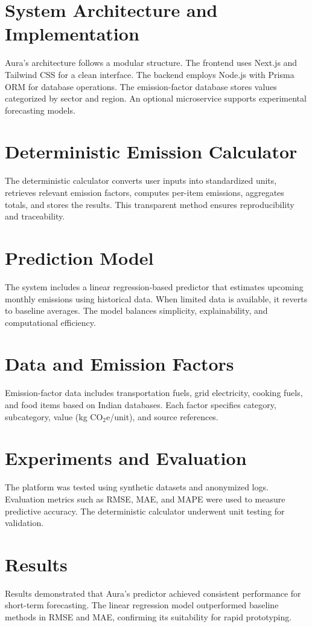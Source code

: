 \documentclass[journal]{IEEEtran}
\begin{document}
\section{System Architecture and Implementation}
Aura's architecture follows a modular structure. The frontend uses Next.js and Tailwind CSS for a clean interface. The backend employs Node.js with Prisma ORM for database operations. The emission-factor database stores values categorized by sector and region. An optional microservice supports experimental forecasting models.

\section{Deterministic Emission Calculator}
The deterministic calculator converts user inputs into standardized units, retrieves relevant emission factors, computes per-item emissions, aggregates totals, and stores the results. This transparent method ensures reproducibility and traceability.

\section{Prediction Model}
The system includes a linear regression-based predictor that estimates upcoming monthly emissions using historical data. When limited data is available, it reverts to baseline averages. The model balances simplicity, explainability, and computational efficiency.

\section{Data and Emission Factors}
Emission-factor data includes transportation fuels, grid electricity, cooking fuels, and food items based on Indian databases. Each factor specifies category, subcategory, value (kg CO$_2$e/unit), and source references.

\section{Experiments and Evaluation}
The platform was tested using synthetic datasets and anonymized logs. Evaluation metrics such as RMSE, MAE, and MAPE were used to measure predictive accuracy. The deterministic calculator underwent unit testing for validation.

\section{Results}
Results demonstrated that Aura's predictor achieved consistent performance for short-term forecasting. The linear regression model outperformed baseline methods in RMSE and MAE, confirming its suitability for rapid prototyping.
\end{document}
